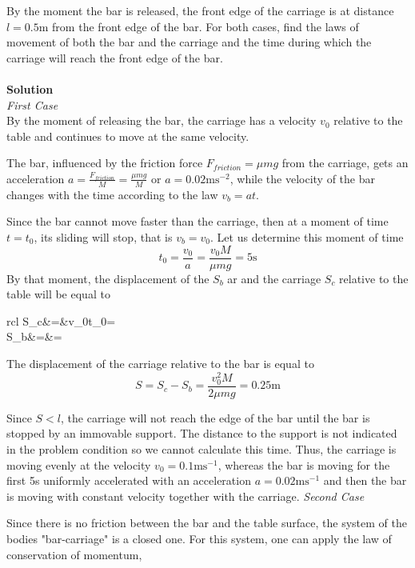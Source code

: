 \documentclass[12pt,a4paper]{book}
\begin{document}
	By the moment the bar is released, the front edge of the carriage is at distance $l=0.5\text{m}$ from the front edge of the bar. For both cases, f\mbox{}ind the laws of movement of both the bar and the carriage and the time during which the carriage will reach the front edge of the bar.\\ \\
	\textbf{Solution}\\
	\emph{First Case}\\
	By the moment of releasing the bar, the carriage has a velocity $v_0$ relative to the table and continues to move at the same velocity.\par
	The bar, inf\mbox{}luenced by the friction force $F_{friction}=\mu mg$ from the carriage, gets an acceleration $a=\frac{F_{friction}}{M}=\frac{\mu mg}{M}$ or $a=0.02\text{ms}^{-2}$, while the velocity of the bar changes with the time according to the law $v_b=at$.\par
	Since the bar cannot move faster than the carriage, then at a moment of time $t=t_0$, its sliding will stop, that is $v_b=v_0$. Let us determine this moment of time
	\begin{equation*}
		t_0=\frac{v_0}{a}=\frac{v_0M}{\mu mg}=5\text{s}
	\end{equation*}
	By that moment, the displacement of the $S_b$ ar and the carriage $S_c$ relative to the table will be equal to
	\begin{IEEEeqnarray*}{rcl}
		S_c&\text{ }=\text{ }&v_0t_0=\\
		S_b&=&=
	\end{IEEEeqnarray*}
	The displacement of the carriage relative to the bar is equal to
	\begin{equation*}
		S=S_c-S_b=\frac{v^2_0M}{2\mu mg}=0.25\text{m}
	\end{equation*}\par
	Since $S<l$, the carriage will not reach the edge of the bar until the bar is stopped by an immovable support. The distance to the support is not indicated in the problem condition so we cannot calculate this time. Thus, the carriage is moving evenly at the velocity $v_0=0.1\text{ms}^{-1}$, whereas the bar is moving for the f\mbox{}irst 5s uniformly accelerated with an acceleration $a=0.02\text{ms}^{-1}$ and then the bar is moving with constant velocity together with the carriage.
	\emph{Second Case}\par
	Since there is no friction between the bar and the table surface, the system of the bodies "bar-carriage" is a closed one. For this system, one can apply the law of conservation of momentum,
\end{document}
